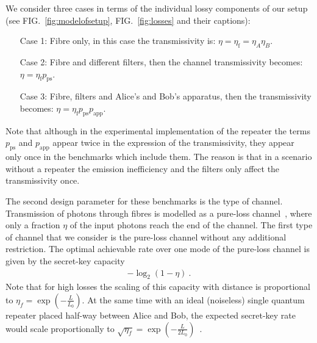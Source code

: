 \documentclass[aps,pra,reprint,superscriptaddress]{revtex4-1}
\begin{document}
We consider three cases in terms of the individual lossy components of our setup (see FIG.~\ref{fig:modelofsetup}, FIG.~\ref{fig:losses} and their captions):
\itemsep-0.9mm 
\itemindent-2cm
\begin{itemize}%
\setlength{\itemindent}{1cm}
\item[Case 1:] Fibre only, in this case the transmissivity is: $\eta = \eta_{\textrm{f}}=\eta_A\eta_B$.
\item[Case 2:] Fibre and different filters, then the channel transmissivity becomes: $\eta = \eta_{\textrm{f}}p_{\textrm{ps}}$.
\item[Case 3:] Fibre, filters and Alice's and Bob's apparatus, then the transmissivity becomes: $\eta = \eta_{\textrm{f}}p_{\textrm{ps}}p_{\textrm{app}}$.
\end{itemize}
Note that although in the experimental implementation of the repeater the terms $p_{\textrm{ps}}$ and $p_{\textrm{app}}$ appear twice in the expression of the transmissivity, they appear only once in the benchmarks which include them. The reason is that in a scenario without a repeater the emission inefficiency and the filters only affect the transmissivity once. 

The second design parameter for these benchmarks is the type of channel.
Transmission of photons through fibres is modelled as a pure-loss channel~\cite{Weedbrook:2012aa}, where only a fraction $\eta$ of the input photons reach the end of the channel. The first type of channel that we consider is the pure-loss channel without any additional restriction. The optimal achievable rate over one mode of the pure-loss channel is given by the secret-key capacity~\cite{pirandola2015fundamental}
\begin{align}
-\log_2\left(1-\eta\right)\label{eq:capacity}\ .
\end{align}
Note that for high losses the scaling of this capacity with distance is proportional to $\eta_f = \exp\left(-\frac{L}{L_0}\right)$. At the same time with an ideal (noiseless) single quantum repeater placed half-way between Alice and Bob, the expected secret-key rate would scale proportionally to $\sqrt{\eta_f} = \exp(-\frac{L}{2L_0})$~\cite{luong2015overcoming}.
\end{document}

